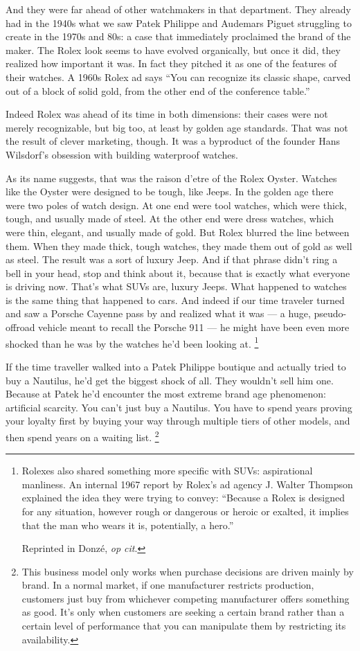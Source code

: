 \documentclass[12pt]{book}
\begin{document}
And they were far ahead of other watchmakers in that department. They
already had in the 1940s what we saw Patek Philippe and Audemars Piguet
struggling to create in the 1970s and 80s: a case that immediately
proclaimed the brand of the maker. The Rolex look seems to have evolved
organically, but once it did, they realized how important it was. In
fact they pitched it as one of the features of their watches. A 1960s
Rolex ad says ``You can recognize its classic shape, carved out of a
block of solid gold, from the other end of the conference table.''

Indeed Rolex was ahead of its time in both dimensions: their cases were
not merely recognizable, but big too, at least by golden age standards.
That was not the result of clever marketing, though. It was a byproduct
of the founder Hans Wilsdorf's obsession with building waterproof
watches.

As its name suggests, that was the raison d'etre of the Rolex Oyster.
Watches like the Oyster were designed to be tough, like Jeeps. In the
golden age there were two poles of watch design. At one end were tool
watches, which were thick, tough, and usually made of steel. At the
other end were dress watches, which were thin, elegant, and usually made
of gold. But Rolex blurred the line between them. When they made thick,
tough watches, they made them out of gold as well as steel. The result
was a sort of luxury Jeep. And if that phrase didn't ring a bell in your
head, stop and think about it, because that is exactly what everyone is
driving now. That's what SUVs are, luxury Jeeps. What happened to
watches is the same thing that happened to cars. And indeed if our time
traveler turned and saw a Porsche Cayenne pass by and realized what it
was --- a huge, pseudo-offroad vehicle meant to recall the Porsche 911
--- he might have been even more shocked than he was by the watches he'd
been looking at. \footnote{Rolexes also shared something more specific with SUVs:
aspirational manliness. An internal 1967 report by Rolex's ad agency J.
Walter Thompson explained the idea they were trying to convey: ``Because
a Rolex is designed for any situation, however rough or dangerous or
heroic or exalted, it implies that the man who wears it is, potentially,
a hero.''

Reprinted in Donzé, \emph{op cit}.}

If the time traveller walked into a Patek Philippe boutique and actually
tried to buy a Nautilus, he'd get the biggest shock of all. They
wouldn't sell him one. Because at Patek he'd encounter the most extreme
brand age phenomenon: artificial scarcity. You can't just buy a
Nautilus. You have to spend years proving your loyalty first by buying
your way through multiple tiers of other models, and then spend years on
a waiting list. \footnote{This business model only works when purchase decisions are
driven mainly by brand. In a normal market, if one manufacturer
restricts production, customers just buy from whichever competing
manufacturer offers something as good. It's only when customers are
seeking a certain brand rather than a certain level of performance that
you can manipulate them by restricting its availability.}
\end{document}
